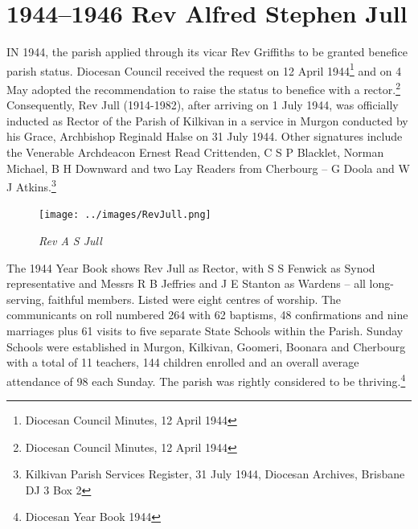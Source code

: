 \newpage


\printendnotes[custom]
\setcounter{endnote}{0}




\chapter{1944--1946 Rev Alfred Stephen Jull}
\nobalance


\lettrine[lines=3]{I}{N}
 1944, the parish applied through its vicar Rev Griffiths to be granted benefice parish status. Diocesan Council received the request on 12 April 1944\footnote{Diocesan Council Minutes, 12 April 1944} and on 4 May adopted the recommendation to raise the status to benefice with a rector.\footnote{Diocesan Council Minutes, 12 April 1944} Consequently, Rev Jull (1914-1982), after arriving on 1 July 1944, was officially inducted as Rector of the Parish of Kilkivan in a service in Murgon conducted by his Grace, Archbishop Reginald Halse on 31 July 1944. Other signatures include the Venerable Archdeacon Ernest Read Crittenden, C S P Blacklet, Norman Michael, B H Downward and two Lay Readers from Cherbourg -- G Doola and W J Atkins.\footnote{Kilkivan Parish Services Register, 31 July 1944, Diocesan Archives, Brisbane DJ 3 Box 2}







\begin{figure}
\begin{center}
\texttt{[image: ../images/RevJull.png]}
\caption{\itshape Rev A S Jull}
\end{center}
\end{figure}




The 1944 Year Book shows Rev Jull as Rector, with S S Fenwick as Synod representative and Messrs R B Jeffries and J E Stanton as Wardens -- all long-serving, faithful members. Listed were eight centres of worship. The communicants on roll numbered 264 with 62 baptisms, 48 confirmations and nine marriages plus 61 visits to five separate State Schools within the Parish. Sunday Schools were established in Murgon, Kilkivan, Goomeri, Boonara and Cherbourg with a total of 11 teachers, 144 children enrolled and an overall average attendance of 98 each Sunday. The parish was rightly considered to be thriving.\footnote{Diocesan Year Book 1944}


